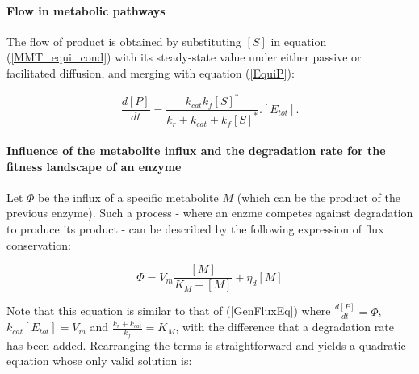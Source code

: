 \noindent\paragraph{Flow in metabolic pathways}

The flow of product is obtained by substituting $[S]$ in equation (\ref{MMT_equi_cond}) with its steady-state value under either passive or facilitated diffusion, and merging with equation (\ref{EquiP}):

\begin{equation}
\frac{d[P]}{dt}=\frac{k_{cat} k_f[S]^*}{k_{r}+k_{cat}+k_f[S]^*}.[E_{tot}].
\label{GenFluxEq}
\end{equation}

\noindent\paragraph{Influence of the metabolite influx and the degradation rate for the fitness landscape of an enzyme}

Let $\Phi$ be the influx of a specific metabolite $M$ (which can be the product of the previous enzyme). Such a process - where an enzme competes against degradation to produce its product - can be described by the following expression of flux conservation:

\begin{equation}
\Phi=V_m \frac{[M]}{K_M+[M]}+ \eta_d[M]
\end{equation}

Note that this equation is similar to that of (\ref{GenFluxEq}) where $\frac{d[P]}{dt}=\Phi$, $k_{cat}[E_{tot}]=V_m$ and $\frac{k_r+k_{cat}}{k_f}=K_M$, with the difference that a degradation rate has been added. Rearranging the terms is straightforward and yields a quadratic equation whose only valid solution is:

